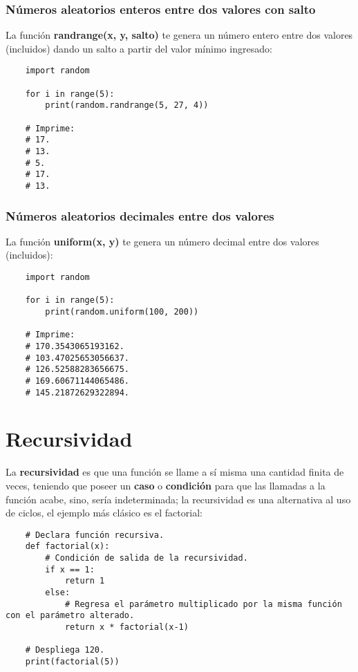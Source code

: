\subsubsection{Números aleatorios enteros entre dos valores con salto}

La función \textbf{randrange(x, y, salto)} te genera un número entero entre dos valores (incluidos) dando un salto a partir del valor mínimo ingresado:
\begin{lstlisting}
    import random

    for i in range(5):
        print(random.randrange(5, 27, 4))

    # Imprime:
    # 17.
    # 13.
    # 5.
    # 17.
    # 13.
\end{lstlisting}


\subsubsection{Números aleatorios decimales entre dos valores}

La función \textbf{uniform(x, y)} te genera un número decimal entre dos valores (incluidos):
\begin{lstlisting}
    import random

    for i in range(5):
        print(random.uniform(100, 200))

    # Imprime:
    # 170.3543065193162.
    # 103.47025653056637.
    # 126.52588283656675.
    # 169.60671144065486.
    # 145.21872629322894.
\end{lstlisting}



\section{Recursividad}

La \textbf{recursividad} es que una función se llame a sí misma una cantidad finita de veces, teniendo que poseer un \textbf{caso} o \textbf{condición} para que las llamadas a la función acabe, sino, sería indeterminada; la recursividad es una alternativa al uso de ciclos, el ejemplo más clásico es el factorial:
\begin{lstlisting}
    # Declara función recursiva.
    def factorial(x):
        # Condición de salida de la recursividad.
        if x == 1:
            return 1
        else:
            # Regresa el parámetro multiplicado por la misma función con el parámetro alterado.
            return x * factorial(x-1)

    # Despliega 120.
    print(factorial(5))
\end{lstlisting}

